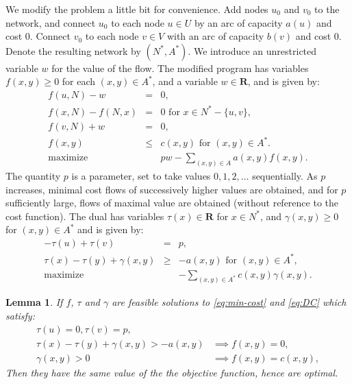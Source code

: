 \documentclass{amsbook}
\newcommand{\RR}{\mathbf R}
\newtheorem{lemma}[theorem]{Lemma}
\theoremstyle{definition}
\theoremstyle{remark}
\begin{document}
We modify the problem a little bit for convenience.
Add nodes $u_0$ and $v_0$ to the network, and connect $u_0$ to each node $u\in U$ by an arc of capacity $a(u)$ and cost $0$.
Connect $v_0$ to each node $v\in V$ with an arc of capacity $b(v)$ and cost $0$.
Denote the resulting network by $(N^*,A^*)$.
We introduce an unrestricted variable $w$ for the value of the flow.
The modified program has variables $f(x,y)\geq 0$ for each $(x,y)\in A^*$, and a variable $w\in \RR$, and is given by:
\begin{equation}
  \tag{C}
  \label{eq:min-cost}
  \begin{array}{rcl}
    f(u,N)-w&=&0,\\
    f(x,N)-f(N,x)&=&0 \text{ for }x\in N^*-\{u,v\},\\
    f(v,N)+w&=&0,\\
    f(x,y)&\leq&c(x,y) \text{ for }(x,y)\in A^*.\\
    \hline
    \text{maximize}&&pw-\sum_{(x,y)\in A} a(x,y)f(x,y).
  \end{array}
\end{equation}
The quantity $p$ is a parameter, set to take values $0,1,2,\dotsc$ sequentially.
As $p$ increases, minimal cost flows of successively higher values are obtained, and for $p$ sufficiently large, flows of maximal value are obtained (without reference to the cost function).
The dual has variables $\tau(x)\in \RR$ for $x\in N^*$, and $\gamma(x,y)\geq 0$ for $(x,y)\in A^*$ and is given by:
\begin{equation}
  \label{eq:DC}
  \tag{DC}
  \begin{array}{rcl}
    -\tau(u)+\tau(v) & = & p,\\
    \tau(x)-\tau(y)+\gamma(x,y)&\geq& -a(x,y) \text{ for }(x,y)\in A^*,\\
    \hline
    \text{maximize}&&-\sum_{(x,y)\in A^*} c(x,y)\gamma(x,y).
  \end{array}
\end{equation}
\begin{lemma}
  \label{lemma:cost-optimality}
  If $f$, $\tau$ and $\gamma$ are feasible solutions to \eqref{eq:min-cost} and \eqref{eq:DC} which satisfy:
  \begin{align*}
    \tau(u)=0, \tau(v)=p,&\\
    \tau(x)-\tau(y)+\gamma(x,y)>-a(x,y) & \implies f(x,y)=0,\\
    \gamma(x,y)>0 & \implies f(x,y)=c(x,y),
  \end{align*}
  Then they have the same value of the the objective function, hence are optimal.
\end{lemma}
\end{document}
